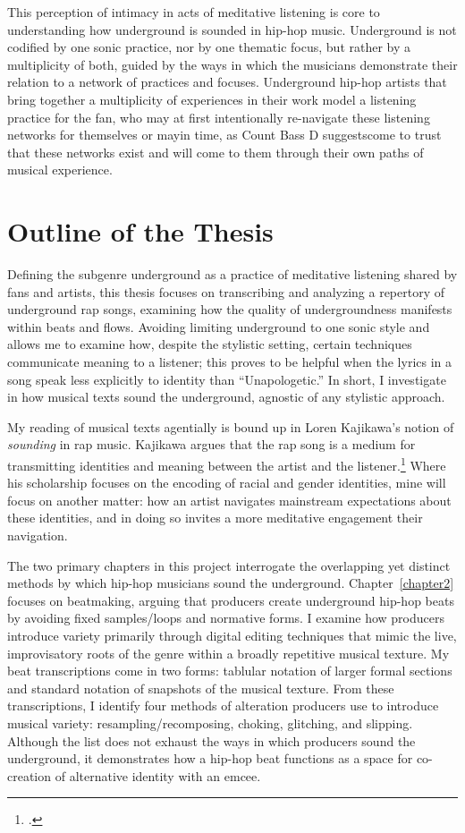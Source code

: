 This perception of intimacy in acts of meditative listening is core to understanding how underground
is sounded in hip-hop music. Underground is not codified by one sonic practice, nor by one thematic
focus, but rather by a multiplicity of both, guided by the ways in which the musicians demonstrate
their relation to a network of practices and focuses. Underground hip-hop artists that bring together
a multiplicity of experiences in their work model a listening practice for the fan, who may at first
intentionally re-navigate these listening networks for themselves or may\textemdash in time, as Count
Bass D suggests\textemdash come to trust that these networks exist and will come to them through their
own paths of musical experience.


\section{Outline of the Thesis}

Defining the subgenre underground as a practice of meditative listening shared by fans and artists,
this thesis focuses on transcribing and analyzing a repertory of underground rap songs, examining
how the quality of undergroundness manifests within beats and flows. Avoiding limiting underground
to one sonic style and allows me to examine how, despite the stylistic setting, certain techniques
communicate meaning to a listener; this proves to be helpful when the lyrics in a song speak less
explicitly to identity than ``Unapologetic.'' In short, I investigate in how musical texts sound
the underground, agnostic of any stylistic approach.

My reading of musical texts agentially is bound up in Loren Kajikawa's notion of \emph{sounding} 
in rap music. Kajikawa argues that the rap song is a medium for transmitting identities and meaning 
between the artist and the listener.\footnote{
    \autocite[2]{lorenkajikawaSoundingRaceRap2015}.}
Where his scholarship focuses on the encoding of racial and gender identities, mine will focus on
another matter: how an artist navigates mainstream expectations about these identities, and 
in doing so invites a more meditative engagement their navigation.

The two primary chapters in this project interrogate the overlapping yet distinct methods by which
hip-hop musicians sound the underground. Chapter~\ref{chapter2} focuses on beatmaking, arguing that
producers create underground hip-hop beats by avoiding fixed samples/loops and normative forms. I 
examine how producers introduce variety primarily through digital editing techniques that mimic the
live, improvisatory roots of the genre within a broadly repetitive musical texture. My beat 
transcriptions come in two forms: tablular notation of larger formal sections and standard notation
of snapshots of the musical texture. From these transcriptions, I identify four methods of alteration
producers use to introduce musical variety: resampling/recomposing, choking, glitching, and slipping.
Although the list does not exhaust the ways in which producers sound the underground, it demonstrates
how a hip-hop beat functions as a space for co-creation of alternative identity with an emcee.

